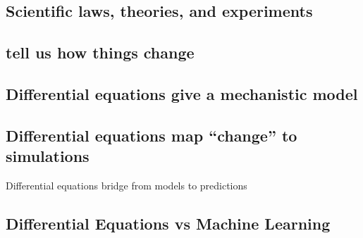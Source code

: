 \documentclass[11pt]{article}
\begin{document}
    \subsection{Scientific laws, theories, and
experiments}\label{scientific-laws-theories-and-experiments}

\subsection{tell us how things change}\label{tell-us-how-things-change}

\subsection{Differential equations give a mechanistic
model}\label{differential-equations-give-a-mechanistic-model}

\subsection{Differential equations map ``change'' to
simulations}\label{differential-equations-map-change-to-simulations}

Differential equations bridge from models to predictions

    \subsection{Differential Equations vs Machine
Learning}\label{differential-equations-vs-machine-learning}
\end{document}
